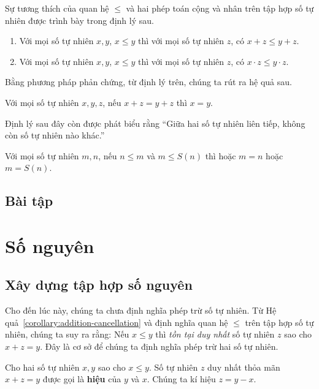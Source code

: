 Sự tương thích của quan hệ $\leq$ và hai phép toán cộng và nhân trên tập hợp số tự nhiên được trình bày trong định lý sau.
\begin{theorem}\label{theorem:natural-numbers-order}
    \begin{enumerate}[label={(\roman*)}]
        \item Với mọi số tự nhiên $x, y$, $x\leq y$ thì với mọi số tự nhiên $z$, có $x + z\leq y + z$.
        \item Với mọi số tự nhiên $x, y$, $x\leq y$ thì với mọi số tự nhiên $z$, có $x\cdot z\leq y\cdot z$.
    \end{enumerate}
\end{theorem}

Bằng phương pháp phản chứng, từ định lý trên, chúng ta rút ra hệ quả sau.
\begin{corollary}\label{corollary:addition-cancellation}
    Với mọi số tự nhiên $x, y, z$, nếu $x + z = y + z$ thì $x = y$.
\end{corollary}

Định lý sau đây còn được phát biểu rằng ``Giữa hai số tự nhiên liên tiếp, không còn số tự nhiên nào khác.''
\begin{theorem}
    Với mọi số tự nhiên $m, n$, nếu $n\leq m$ và $m \leq S(n)$ thì hoặc $m = n$ hoặc $m = S(n)$.
\end{theorem}

\subsection{Bài tập}

\section{Số nguyên}

\subsection{Xây dựng tập hợp số nguyên}

Cho đến lúc này, chúng ta chưa định nghĩa phép trừ số tự nhiên. Từ Hệ quả~\ref{corollary:addition-cancellation} và định nghĩa quan hệ $\leq$ trên tập hợp số tự nhiên, chúng ta suy ra rằng: Nếu $x\leq y$ thì \textit{tồn tại duy nhất} số tự nhiên $z$ sao cho $x + z = y$. Đây là cơ sở để chúng ta định nghĩa phép trừ hai số tự nhiên.

\begin{definition}
    Cho hai số tự nhiên $x, y$ sao cho $x\leq y$. Số tự nhiên $z$ duy nhất thỏa mãn $x + z = y$ được gọi là \textbf{hiệu} của $y$ và $x$. Chúng ta kí hiệu $z = y - x$.
\end{definition}

